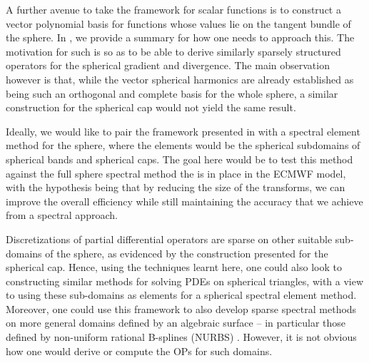 A further avenue to take the framework for scalar functions is to construct a vector polynomial basis for functions whose values lie on the tangent bundle of the sphere. In , we provide a summary for how one needs to approach this. The motivation for such is so as to be able to derive similarly sparsely structured operators for the spherical gradient and divergence. The main observation however is that, while the vector spherical harmonics are already established as being such an orthogonal and complete basis for the whole sphere, a similar construction for the spherical cap would not yield the same result.

Ideally, we would like to pair the framework presented in  with a spectral element method for the sphere, where the elements would be the spherical subdomains of spherical bands and spherical caps. The goal here would be to test this method against the full sphere spectral method the is in place in the ECMWF model, with the hypothesis being that by reducing the size of the transforms, we can improve the overall efficiency while still maintaining the accuracy that we achieve from a spectral approach. 

Discretizations of partial differential operators are sparse on other suitable sub-domains of the sphere, as evidenced by the construction presented for the spherical cap. Hence, using the techniques learnt here, one could also look to constructing similar methods for solving PDEs on spherical triangles, with a view to using these sub-domains as elements for a spherical spectral element method. Moreover, one could use this framework to also develop sparse spectral methods on more general domains defined by an algebraic surface -- in particular those defined by non-uniform rational B-splines (NURBS) . However, it is not obvious how one would derive or compute the OPs for such domains.









  







